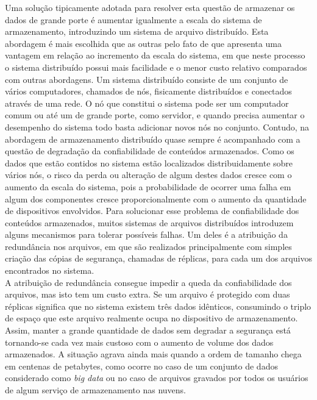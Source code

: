 	
	Uma solução tipicamente adotada  para  resolver esta questão de armazenar os dados de grande porte é aumentar igualmente a escala do sistema de armazenamento, introduzindo um sistema de arquivo distribuído.
	Esta abordagem é mais escolhida que as outras pelo fato de que apresenta uma vantagem em relação ao incremento da escala do sistema, em que neste processo o sistema distribuído possui mais facilidade e o menor custo relativo comparados com outras abordagens. 
	Um sistema distribuído consiste de um conjunto de vários computadores, chamados de nós, fisicamente distribuídos e conectados através de uma rede. 
	O nó que constitui o sistema pode ser um computador comum ou até um de grande porte, como servidor, e quando precisa aumentar o desempenho do sistema todo basta adicionar novos nós no conjunto. 
	Contudo, na abordagem de armazenamento distribuído quase sempre é  acompanhado com a questão de degradação da confiabilidade de conteúdos armazenados. 
	Como os dados que estão contidos no sistema estão localizados distribuidamente sobre vários nós, o risco da perda ou alteração de algum destes dados cresce com o aumento da escala do sistema, pois a probabilidade de ocorrer uma falha em algum dos componentes cresce proporcionalmente com o aumento da quantidade de dispositivos envolvidos.
	Para solucionar esse problema de confiabilidade dos conteúdos armazenados, muitos sistemas de arquivos distribuídos introduzem alguns mecanismos para tolerar possíveis falhas. 
	Um deles é a atribuição da redundância nos arquivos, em que são realizados principalmente com simples criação das cópias de segurança, chamadas de réplicas, para cada um dos arquivos encontrados no sistema. 
	\\
	
	A atribuição de redundância consegue impedir a queda da confiabilidade dos arquivos, mas isto tem um custo extra.
	Se um arquivo é protegido com duas réplicas significa que no sistema existem três dados idênticos, consumindo o triplo de espaço que este arquivo realmente ocupa no dispositivo de armazenamento. 
	Assim, manter a grande quantidade de dados sem degradar a segurança está tornando-se cada vez mais custoso com o aumento de volume dos dados armazenados. 
	A situação agrava ainda mais quando a ordem de tamanho chega em centenas de petabytes, como ocorre no caso de um conjunto de dados considerado como \textit{big data} ou no caso de arquivos gravados por todos os usuários de algum serviço de armazenamento nas nuvens. 
	
